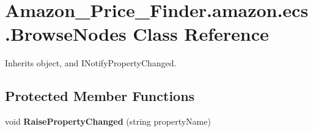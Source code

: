 \hypertarget{class_amazon___price___finder_1_1amazon_1_1ecs_1_1_browse_nodes}{\section{Amazon\-\_\-\-Price\-\_\-\-Finder.\-amazon.\-ecs.\-Browse\-Nodes Class Reference}
\label{class_amazon___price___finder_1_1amazon_1_1ecs_1_1_browse_nodes}
}


 




Inherits object, and I\-Notify\-Property\-Changed.

\subsection*{Protected Member Functions}
\begin{DoxyCompactItemize}
\item 
\hypertarget{class_amazon___price___finder_1_1amazon_1_1ecs_1_1_browse_nodes_ae0462f37134b9507c0fc1dab202bfbb8}{void {\bfseries Raise\-Property\-Changed} (string property\-Name)}\label{class_amazon___price___finder_1_1amazon_1_1ecs_1_1_browse_nodes_ae0462f37134b9507c0fc1dab202bfbb8}

\end{DoxyCompactItemize}
